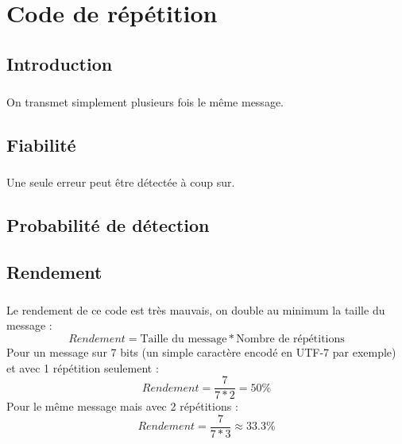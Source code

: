 
\chapter{Code de répétition}

    \section{Introduction}

        \paragraph{}
On transmet simplement plusieurs fois le même message.


    \section{Fiabilité}

        \paragraph{}
Une seule erreur peut être détectée à coup sur.


    \section{Probabilité de détection}

        \paragraph{}


    \section{Rendement}

        \paragraph{}
Le rendement de ce code est très mauvais, on double au minimum la taille du message :
\[  Rendement = \text{Taille du message}*\text{Nombre de répétitions} \]
Pour un message sur 7 bits (un simple caractère encodé en UTF-7 par exemple) et avec 1 répétition seulement :
\[  Rendement = \frac{7}{7*2} = 50\% \]
Pour le même message mais avec 2 répétitions :
\[  Rendement = \frac{7}{7*3} \approx 33.3\% \]
